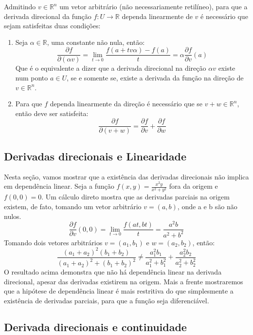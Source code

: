 Admitindo $v\in\mathbb{R}^n$ um vetor arbitrário (não necessariamente retilíneo), para que a derivada direcional da função $f:U\to\mathbb{R}$ dependa linearmente de $v$ é necessário que sejam satisfeitas duas condições:

\begin{enumerate}
	\item Seja $\alpha \in \mathbb{R}$, uma constante não nula, então:
	\[
	\frac{\partial f}{\partial (\alpha v)} 
	= \lim_{t \to 0} \frac{f(a + tv\alpha)-f(a)}{t} 
	= \alpha \frac{\partial f}{\partial v}(a) 
	\]
	Que é o equivalente a dizer que a derivada direcional na direção $\alpha v$ existe num ponto $a\in U$, se e somente se, existe a derivada da função na direção de $v \in \mathbb{R}^n$.
	\item Para que $f$ dependa linearmente da direção é necessário que se $v + w \in \mathbb{R}^n$, então deve ser satisfeita:
	\[
	\frac{\partial f}{\partial (v + w)} 
	= \frac{\partial f}{\partial v} 
	+ \frac{\partial f}{\partial w} 
	\]
\end{enumerate}



\subsection{Derivadas direcionais e Linearidade} 

Nesta seção, vamos mostrar que a existência das derivadas direcionais não implica em dependência linear. Seja a função $f(x,y) = \frac{x^2y}{x^2+y^2}$ fora da origem e $f(0,0) = 0$. 
Um cálculo direto mostra que as derivadas parciais na origem existem, de fato, tomando um vetor arbitrário $v = (a,b)$, onde a e b são não nulos.
%
\[
\frac{\partial f}{\partial v}(0,0) 
= \lim_{t \to 0}\frac{f(at,bt)}{t}
= \frac{a^2b}{a^2+b^2}
\]
%
Tomando dois vetores arbitrários $v = (a_1,b_1)$ e $w = (a_2,b_2)$, então:
%
\[
\frac{(a_1+a_2)^2(b_1+b_2)}{(a_1+a_2)^2+(b_1+b_2)^2} 
\neq \frac{a_1^2b_1}{a_1^2+b_1^2} + \frac{a_2^2b_2}{a_2^2+b_2^2}
\]
%
%
O resultado acima demonstra que não há dependência linear na derivada direcional, apesar das derivadas existirem na origem. Mais a frente mostraremos que a hipótese de dependência linear é mais restritiva do que simplesmente a existência de derivadas parciais, para que a função seja diferenciável.



\subsection{Derivada direcionais e continuidade} 

